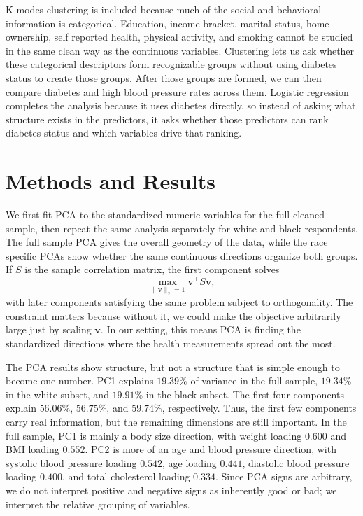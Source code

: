 \documentclass[10pt]{article}
\begin{document}
K modes clustering is included because much of the social and behavioral information is categorical.
Education, income bracket, marital status, home ownership, self reported health, physical activity, and smoking cannot be studied in the same clean way as the continuous variables.
Clustering lets us ask whether these categorical descriptors form recognizable groups without using diabetes status to create those groups.
After those groups are formed, we can then compare diabetes and high blood pressure rates across them.
 Logistic regression completes the analysis because it uses diabetes directly, so instead of asking what structure exists in the predictors, it asks whether those predictors can rank diabetes status and which variables drive that ranking.

\section{Methods and Results}

We first fit PCA to the standardized numeric variables for the full cleaned sample, then repeat the same analysis separately for white and black respondents. The full sample PCA gives the overall geometry of the data, while the race specific PCAs show whether the same continuous directions organize both groups. If $S$ is the sample correlation matrix, the first component solves
\[
  \max_{\|\bm{v}\|_2=1} \bm{v}^{\top}S\bm{v},
\]
with later components satisfying the same problem subject to orthogonality. The constraint matters because without it, we could make the objective arbitrarily large just by scaling $\bm{v}$. In our setting, this means PCA is finding the standardized directions where the health measurements spread out the most.

The PCA results show structure, but not a structure that is simple enough to become one number. PC1 explains $19.39\%$ of variance in the full sample, $19.34\%$ in the white subset, and $19.91\%$ in the black subset. The first four components explain $56.06\%$, $56.75\%$, and $59.74\%$, respectively. Thus, the first few components carry real information, but the remaining dimensions are still important. In the full sample, PC1 is mainly a body size direction, with weight loading $0.600$ and BMI loading $0.552$. PC2 is more of an age and blood pressure direction, with systolic blood pressure loading $0.542$, age loading $0.441$, diastolic blood pressure loading $0.400$, and total cholesterol loading $0.334$. Since PCA signs are arbitrary, we do not interpret positive and negative signs as inherently good or bad; we interpret the relative grouping of variables.
\end{document}
